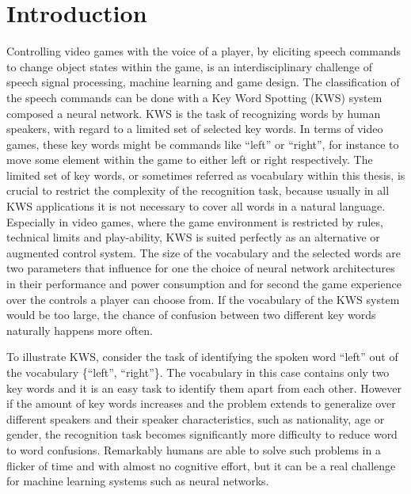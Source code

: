 
\chapter{Introduction}\label{sec:intro}
\thesisStateReady
Controlling video games with the voice of a player, by eliciting speech commands to change object states within the game, is an interdisciplinary challenge of speech signal processing, machine learning and game design.
The classification of the speech commands can be done with a Key Word Spotting (KWS) system composed a neural network.
KWS is the task of recognizing words by human speakers, with regard to a limited set of selected key words.
In terms of video games, these key words might be commands like \enquote{left} or \enquote{right}, for instance to move some element within the game to either left or right respectively.
The limited set of key words, or sometimes referred as vocabulary within this thesis, is crucial to restrict the complexity of the recognition task, because usually in all KWS applications it is not necessary to cover all words in a natural language.
Especially in video games, where the game environment is restricted by rules, technical limits and play-ability, KWS is suited perfectly as an alternative or augmented control system.
The size of the vocabulary and the selected words are two parameters that influence for one the choice of neural network architectures in their performance and power consumption and for second the game experience over the controls a player can choose from.
If the vocabulary of the KWS system would be too large, the chance of confusion between two different key words naturally happens more often.

To illustrate KWS, consider the task of identifying the spoken word \enquote{left} out of the vocabulary \{\enquote{left}, \enquote{right}\}.
The vocabulary in this case contains only two key words and it is an easy task to identify them apart from each other.
However if the amount of key words increases and the problem extends to generalize over different speakers and their speaker characteristics, such as nationality, age or gender, the recognition task becomes significantly more difficulty to reduce word to word confusions.
Remarkably humans are able to solve such problems in a flicker of time and with almost no cognitive effort, but it can be a real challenge for machine learning systems such as neural networks.

